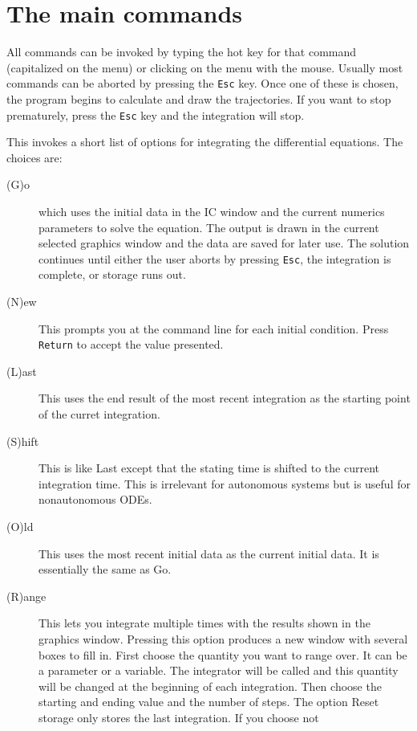 \section{The main commands}
All commands can be invoked by typing the hot key for that command (capitalized
 on the menu) or clicking on the menu with the mouse.  Usually most commands can
 be aborted by pressing the {\tt Esc} key. Once one of these is chosen, the
 program begins to calculate and draw the trajectories.  If you want to
 stop prematurely, press the {\tt Esc} key and the integration will
stop. 

\begin{description}

\item[(I)nitial conds] This invokes a short list of options for integrating the
 differential equations.  The choices are:
\begin{description}
\item[(G)o] which uses the initial data in the IC window and the current
 numerics parameters to solve the equation.  The output is drawn in the
 current selected graphics window and the data are saved for later use.  The
 solution continues until either the user aborts by pressing {\tt Esc}, the
 integration is complete, or storage runs out.
\item[(N)ew] This prompts you at the command line for each initial condition.
 Press {\tt Return} to accept the value presented.
\item[(L)ast]  This uses the end result of the most recent integration as the
 starting point of the curret integration.
\item[(S)hift] This is like Last except that the stating time is shifted to the 
current integration time.  This is irrelevant for autonomous systems but is
 useful for nonautonomous ODEs.
\item[(O)ld] This uses the most recent initial data as the current initial 
data.  It is essentially the same as Go.
\item[(R)ange]  This lets you integrate multiple times with the results shown
 in the graphics window.  Pressing this option produces a new window with
 several boxes to fill in.  First choose the quantity you want to range
 over.  It can be a parameter or a variable.  The integrator will be called
 and this quantity will be changed at the beginning of each integration.
  Then choose the starting and ending value and the number of steps. The
 option Reset storage only stores the last integration.  If you choose not

\end{description}
\end{description}
